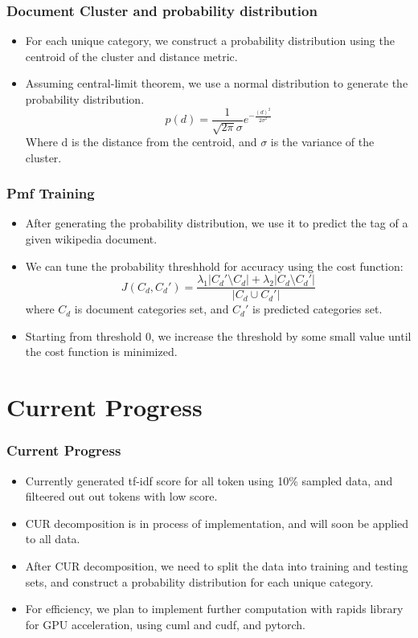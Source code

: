 \documentclass[
    10pt %
    16:9, %
]{beamer}
\begin{document}
\begin{frame}
  \frametitle{Document Cluster and probability distribution}
  \begin{itemize}
    \item For each unique category, we construct a probability distribution using the centroid of the cluster and distance metric.
    \item Assuming central-limit theorem, we use a normal distribution to generate the probability distribution.
    \[
      p(d) = \frac{1}{\sqrt{2\pi}\sigma}e^{-\frac{(d)^2}{2\sigma^2}}
    \]
    Where d is the distance from the centroid, and \(\sigma\) is the variance of the cluster.
  \end{itemize}
\end{frame}

\begin{frame}
  \frametitle{Pmf Training}
  \begin{itemize}
    \item After generating the probability distribution, we use it to predict the tag of a given wikipedia document.
    \item We can tune the probability threshhold for accuracy using the cost function:
    \[
      J(C_d, C_d') = \frac{\lambda_1|C_d'\setminus C_d| + \lambda_2|C_d\setminus C_d'|}{|C_d\cup C_d'|}
    \]
    where $C_d$ is document categories set, and $C_d'$ is predicted categories set.
    \item Starting from threshold 0, we increase the threshold by some small value until the cost function is minimized.
  \end{itemize}
\end{frame}

\section{Current Progress}
\begin{frame}
  \frametitle{Current Progress}
  \begin{itemize}
    \item Currently generated tf-idf score for all token using 10\% sampled data, and filteered out out tokens with low score.
    \item CUR decomposition is in process of implementation, and will soon be applied to all data.
    \item After CUR decomposition, we need to split the data into training and testing sets, and construct a probability distribution for each unique category.
    \item For efficiency, we plan to implement further computation with rapids library for GPU acceleration, using cuml and cudf, and pytorch.
  \end{itemize}
\end{frame}
\end{document}
